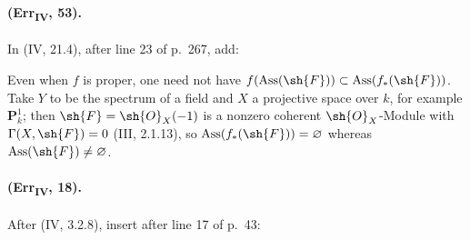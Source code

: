 \paragraph{(Err\textsubscript{IV}, 53).}
In (IV, 21.4), after line 23 of p.~267, add:

\def\EGAIVSuppressErratumLabels{1}

\let\EGAIVSuppressErratumLabels\undefined

\begin{remark}[3.1.10.5]
Even when $f$ is proper, one need not have
$f(\operatorname{Ass}(\sh{F}))\subset
\operatorname{Ass}(f_*(\sh{F}))$.  Take $Y$ to be the spectrum of a
field and $X$ a projective space over $k$, for example $\mathbf P^1_k$;
then $\sh{F}=\sh{O}_X(-1)$ is a nonzero coherent $\sh{O}_X$-Module with
$\Gamma(X,\sh{F})=0$ (III, 2.1.13), so
$\operatorname{Ass}(f_*(\sh{F}))=\varnothing$ whereas
$\operatorname{Ass}(\sh{F})\neq\varnothing$.
\end{remark}

\paragraph{(Err\textsubscript{IV}, 18).}
After (IV, 3.2.8), insert after line 17 of p.~43:

